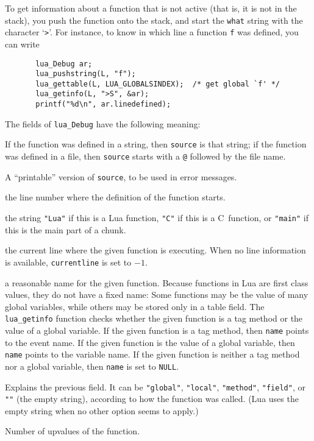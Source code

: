 \documentclass[11pt,twoside,draft]{article}
\newcommand{\Math}[1]{$#1$}
\begin{document}
To get information about a function that is not active (that is,
it is not in the stack),
you push the function onto the stack,
and start the \verb|what| string with the character `\verb|>|'.
For instance, to know in which line a function \verb|f| was defined,
you can write
\begin{verbatim}
       lua_Debug ar;
       lua_pushstring(L, "f");
       lua_gettable(L, LUA_GLOBALSINDEX);  /* get global `f' */
       lua_getinfo(L, ">S", &ar);
       printf("%d\n", ar.linedefined);
\end{verbatim}
The fields of \verb|lua_Debug| have the following meaning:
\begin{description}\leftskip=20pt

\item[source]
If the function was defined in a string,
then \verb|source| is that string;
if the function was defined in a file,
then \verb|source| starts with a \verb|@| followed by the file name.

\item[short\_src]
A ``printable'' version of \verb|source|, to be used in error messages.

\item[linedefined]
the line number where the definition of the function starts.

\item[what] the string \verb|"Lua"| if this is a Lua function,
\verb|"C"| if this is a C~function,
or \verb|"main"| if this is the main part of a chunk.

\item[currentline]
the current line where the given function is executing.
When no line information is available,
\verb|currentline| is set to \Math{-1}.

\item[name]
a reasonable name for the given function.
Because functions in Lua are first class values,
they do not have a fixed name:
Some functions may be the value of many global variables,
while others may be stored only in a table field.
The \verb|lua_getinfo| function checks whether the given
function is a tag method or the value of a global variable.
If the given function is a tag method,
then \verb|name| points to the event name.
If the given function is the value of a global variable,
then \verb|name| points to the variable name.
If the given function is neither a tag method nor a global variable,
then \verb|name| is set to \verb|NULL|.

\item[namewhat]
Explains the previous field.
It can be \verb|"global"|, \verb|"local"|, \verb|"method"|,
\verb|"field"|, or \verb|""| (the empty string),
according to how the function was called.
(Lua uses the empty string when no other option seems to apply.)

\item[nups]
Number of upvalues of the function.

\end{description}
\end{document}
